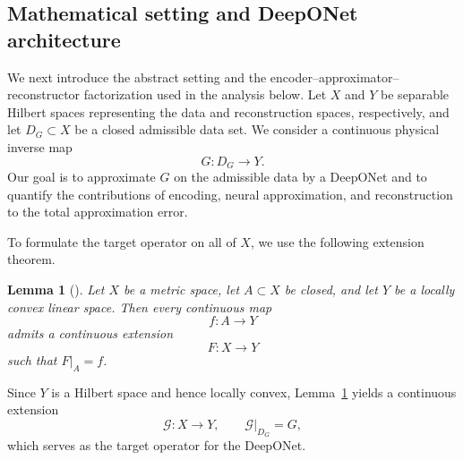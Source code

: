 \documentclass{article}
\numberwithin{equation}{section}
\theoremstyle{plain}
\newtheorem{lemma}{Lemma}[section]
\begin{document}
	\subsection{Mathematical setting and DeepONet architecture}
	
	We next introduce the abstract setting and the
	encoder--approximator--reconstructor factorization used in the analysis below.
	Let $X$ and $Y$ be separable Hilbert spaces representing the data and
	reconstruction spaces, respectively, and let $D_G\subset X$ be a closed
	admissible data set. We consider a continuous physical inverse map
	\begin{equation*}
		G:D_G\to Y.
	\end{equation*}
	Our goal is to approximate $G$ on the admissible data by a DeepONet and to
	quantify the contributions of encoding, neural approximation, and
	reconstruction to the total approximation error.
	
	To formulate the target operator on all of $X$, we use the following
	extension theorem.
	
	\begin{lemma}[\cite{Dug51}]\label{lem:dugundji}
		Let $X$ be a metric space, let $A\subset X$ be closed, and let $Y$ be a
		locally convex linear space. Then every continuous map
		\begin{equation*}
			f:A\to Y
		\end{equation*}
		admits a continuous extension
		\begin{equation*}
			F:X\to Y
		\end{equation*}
		such that $F|_A=f$.
	\end{lemma}
	
	Since $Y$ is a Hilbert space and hence locally convex,
	Lemma~\ref{lem:dugundji} yields a continuous extension
	\begin{equation*}
		\mathscr G:X\to Y,
		\qquad
		\mathscr G|_{D_G}=G,
	\end{equation*}
	which serves as the target operator for the DeepONet.
	
\end{document}

